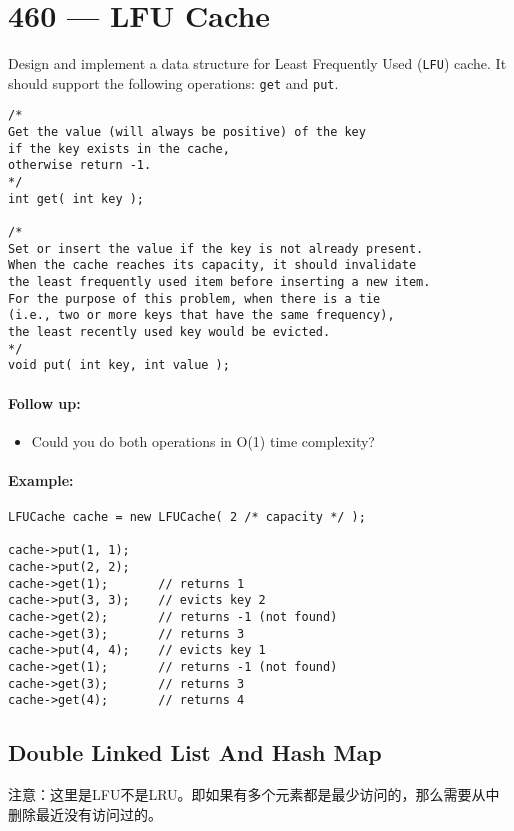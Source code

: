 \section{460 --- LFU Cache}
Design and implement a data structure for Least Frequently Used (\texttt{LFU}) cache. It should support the following operations: \texttt{get} and \texttt{put}.

\begin{lstlisting}[style=customc]
/*
Get the value (will always be positive) of the key
if the key exists in the cache,
otherwise return -1.
*/
int get( int key );

/*
Set or insert the value if the key is not already present.
When the cache reaches its capacity, it should invalidate
the least frequently used item before inserting a new item.
For the purpose of this problem, when there is a tie
(i.e., two or more keys that have the same frequency),
the least recently used key would be evicted.
*/
void put( int key, int value );

\end{lstlisting}

\paragraph{Follow up:}

\begin{itemize}
\item Could you do both operations in O(1) time complexity?
\end{itemize}

\paragraph{Example:}

\begin{lstlisting}[style=customc]
LFUCache cache = new LFUCache( 2 /* capacity */ );

cache->put(1, 1);
cache->put(2, 2);
cache->get(1);       // returns 1
cache->put(3, 3);    // evicts key 2
cache->get(2);       // returns -1 (not found)
cache->get(3);       // returns 3
cache->put(4, 4);    // evicts key 1
cache->get(1);       // returns -1 (not found)
cache->get(3);       // returns 3
cache->get(4);       // returns 4
\end{lstlisting}

\subsection{Double Linked List And Hash Map}
注意：这里是LFU不是LRU。即如果有多个元素都是最少访问的，那么需要从中删除最近没有访问过的。

